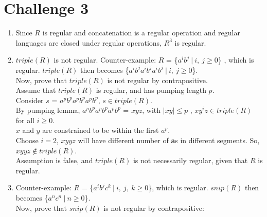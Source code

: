 \documentclass{article}
\begin{document}
\section*{Challenge 3}
\begin{enumerate}
    \item
    Since $R$ is regular and concatenation is a regular operation and regular languages are closed under regular operations, $R^3$ is regular.
    \item
    $triple(R)$ is not regular. Counter-example: $R$ = \{$a^ib^j\ |\ i,\ j \geq 0$\} , which is regular. $triple(R)$ then becomes \{$a^ib^ja^ib^ja^ib^j\ |\ i,\ j \geq 0$\}.\\    
    Now, prove that $triple(R)$ is not regular by contrapositive.\\
    Assume that $triple(R)$ is regular, and has pumping length $p$.\\
    Consider $s$ = $a^pb^pa^pb^pa^pb^p$, $s \in triple(R)$.\\
    By pumping lemma, $a^pb^pa^pb^pa^pb^p$ = $xyz$, with $|xy| \leq p$ , $xy^iz \in triple(R)$ for all $i \geq 0$.\\
    $x$ and $y$ are constrained to be within the first $a^p$.\\
    Choose $i = 2$, $xyyz$ will have different number of \textbf{a}s in different segments. So, $xyyz \notin triple(R)$.\\
    Assumption is false, and $triple(R)$ is not necessarily regular, given that $R$ is regular.
    \item
    Counter-example: $R$ = \{$a^ib^jc^k\ |\ i,\ j,\ k \geq 0$\}, which is regular. $snip(R)$ then becomes \{$a^nc^n\ |\ n \geq 0$\}.\\
    Now, prove that $snip(R)$ is not regular by contrapositive:\\

\end{enumerate}
\end{document}
